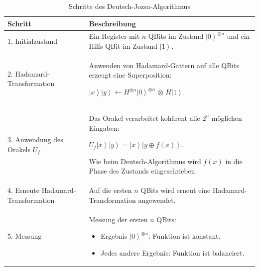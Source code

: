 \begin{table}[h]
    \centering
    \renewcommand{\arraystretch}{1.5}
    \begin{tabular}{p{3cm} p{8cm}}
        \textbf{Schritt} & \textbf{Beschreibung} \\ \hline

        1. Initialzustand &
        Ein Register mit \(n\) QBits im Zustand \(\left|0\right\rangle^{\otimes n}\) und ein Hilfs-QBit im Zustand \(\left|1\right\rangle\).
        \\

        2. Hadamard-Transformation &
        Anwenden von Hadamard-Gattern auf alle QBits erzeugt eine Superposition:
        
        \(\left|x\right\rangle\left|y\right\rangle \gets H^{\otimes n}\left|0\right\rangle^{\otimes n}\,\otimes\,H\left|1\right\rangle\).
        \\

        3. Anwendung des Orakels \(U_f\) &
        Das Orakel verarbeitet kohärent alle \(2^n\) möglichen Eingaben:
        
        \(
        U_f \left|x\right\rangle\left|y\right\rangle = \left|x\right\rangle\left|y \oplus f(x)\right\rangle.
        \)
        
        Wie beim Deutsch-Algorithmus wird \(f(x)\) in die Phase des Zustands eingeschrieben.
        \\

        4. Erneute Hadamard-Transformation &
        Auf die ersten \(n\) QBits wird erneut eine Hadamard-Transformation angewendet.
        \\

        5. Messung &
        Messung der ersten \(n\) QBits:
        \begin{itemize}
            \item Ergebnis \(\left|0\right\rangle^{\otimes n}\): Funktion ist konstant.
            \item Jedes andere Ergebnis: Funktion ist balanciert.
        \end{itemize}
        \\
    \end{tabular}
    \caption{Schritte des Deutsch-Jozsa-Algorithmus}
    \label{tab:deutsch_jozsa}
\end{table}


